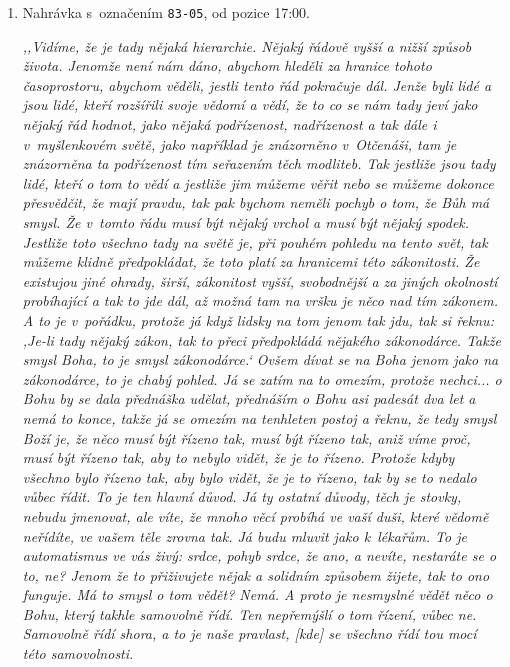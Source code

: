 \begin{enumerate}

\item{
Nahrávka s~označením \texttt{83-05}, od pozice 17:00.

\textit{%
,,Vidíme, že je tady nějaká hierarchie. Nějaký řádově vyšší a nižší způsob
života. Jenomže není nám dáno, abychom hleděli za hranice tohoto časoprostoru,
abychom věděli, jestli tento řád pokračuje dál. Jenže byli lidé a jsou lidé,
kteří rozšířili svoje vědomí a vědí, že to co se nám tady jeví jako nějaký řád
hodnot, jako nějaká podřízenost, nadřízenost a tak dále i v~myšlenkovém světě,
jako například je znázorněno v~Otčenáši, tam je znázorněna ta podřízenost tím
seřazením těch modliteb. Tak jestliže jsou tady lidé, kteří o tom to vědí a
jestliže jim můžeme věřit nebo se můžeme dokonce přesvědčit, že mají pravdu, tak
pak bychom neměli pochyb o tom, že Bůh má smysl. Že v~tomto řádu musí být nějaký
vrchol a musí být nějaký spodek. Jestliže toto všechno tady na světě je, při
pouhém pohledu na tento svět, tak můžeme klidně předpokládat, že toto platí za
hranicemi této zákonitosti. Že existujou jiné ohrady, širší, zákonitost vyšší,
svobodnější a za jiných okolností probíhající a tak to jde dál, až možná tam na
vršku je něco nad tím zákonem. A to je v~pořádku, protože já když lidsky na tom
jenom tak jdu, tak si řeknu: ,Je-li tady nějaký zákon, tak to přeci předpokládá
nějakého zákonodárce. Takže smysl Boha, to je smysl zákonodárce.` Ovšem dívat se
na Boha jenom jako na zákonodárce, to je chabý pohled. Já se zatím na to omezím,
protože nechci... o Bohu by se dala přednáška udělat, přednáším o Bohu asi
padesát dva let a nemá to konce, takže já se omezím na tenhleten postoj a řeknu,
že tedy smysl Boží je, že něco musí být řízeno tak, musí být řízeno tak, aniž
víme proč, musí být řízeno tak, aby to nebylo vidět, že je to řízeno. Protože
kdyby všechno bylo řízeno tak, aby bylo vidět, že je to řízeno, tak by se to
nedalo vůbec řídit. To je ten hlavní důvod. Já ty ostatní důvody, těch je
stovky, nebudu jmenovat, ale víte, že mnoho věcí probíhá ve vaší duši, které
vědomě neřídíte, ve vašem těle zrovna tak. Já budu mluvit jako k~lékařům. To je
automatismus ve vás živý: srdce, pohyb srdce, že ano, a nevíte, nestaráte se o
to, ne? Jenom že to přiživujete nějak a solidním způsobem žijete, tak to ono
funguje. Má to smysl o tom vědět? Nemá. A proto je nesmyslné vědět něco o Bohu,
který takhle samovolně řídí. Ten nepřemýšlí o tom řízení, vůbec ne. Samovolně
řídí shora, a to je naše pravlast, [kde] se všechno řídí tou mocí této samovolnosti.
}}
\end{enumerate}
